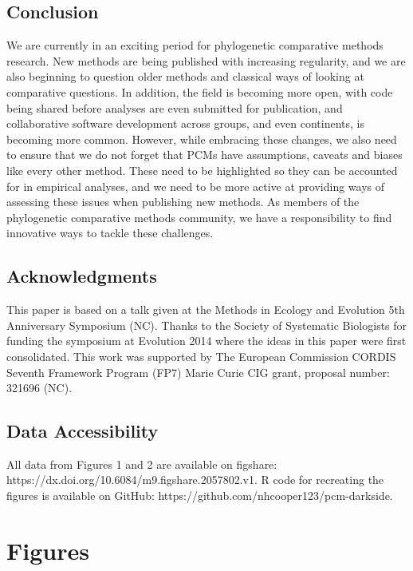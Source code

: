 \documentclass[a4paper,12pt]{article}
\begin{document}
  \subsection{Conclusion}
    We are currently in an exciting period for phylogenetic comparative methods research.
    New methods are being published with increasing regularity, and we are also beginning to question older methods and classical ways of looking at comparative questions. 
    In addition, the field is becoming more open, with code being shared before analyses are even submitted for publication, and collaborative software development across groups, and even continents, is becoming more common.
    However, while embracing these changes, we also need to ensure that we do not forget that PCMs have assumptions, caveats and biases like every other method. 
    These need to be highlighted so they can be accounted for in empirical analyses, and we need to be more active at providing ways of assessing these issues when publishing new methods.
    As members of the phylogenetic comparative methods community, we have a responsibility to find innovative ways to tackle these challenges. 

  \subsection{Acknowledgments}
    This paper is based on a talk given at the Methods in Ecology and Evolution 5th Anniversary Symposium (NC).
    Thanks to the Society of Systematic Biologists for funding the symposium at Evolution 2014 where the ideas in this paper were first consolidated. 
    This work was supported by The European Commission CORDIS Seventh Framework Program (FP7) Marie Curie CIG grant, proposal number: 321696 (NC).

  \subsection{Data Accessibility}
    All data from Figures 1 and 2 are available on figshare: https://dx.doi.org/10.6084/m9.figshare.2057802.v1. R code for recreating the figures is available on GitHub: https://github.com/nhcooper123/pcm-darkside.




\newpage
\section{Figures}
\end{document}
